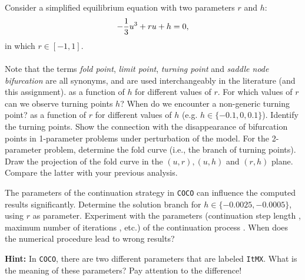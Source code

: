 \begin{Exercise}[name=Imperfect bifurcations]\label{EX22}

Consider a simplified equilibrium equation with two parameters $r$ and $h$:
\[ - \frac{1}{\textcolor{black}{3}}u^3 +ru + h = 0, \] in which $r\in [-1,1]$. \\\\
%
Note that the terms \emph{fold point}, \emph{limit point},
\emph{turning point} and \emph{saddle node bifurcation} are all
synonyms, and are used interchangeably in the literature (and  this
assignment).
\Question {} as a function of $h$ for different values of $r$.
For which values of $r$ can we observe turning points  $h$?
When do we encounter a non-generic turning point?
\Question {} as a function of $r$ for different values of $h$ (e.g. $h \in \{-0.1, 0, 0.1\}$).
Identify the turning points.
Show the connection with the disappearance of bifurcation points in 1-parameter problems under perturbation of the model. 
\Question For the 2-parameter problem, determine the fold curve (i.e., the branch of turning points).
Draw the projection of the fold curve in the $(u,r),
(u,h)$ and $(r,h)$ plane. Compare the latter with your previous
analysis. %

\Question The parameters of the continuation strategy in \texttt{COCO} can influence the computed results significantly. Determine the solution branch for $h \in \{-0.0025, -0.0005\}$, using $r$ as parameter. 
Experiment with the parameters (continuation step length , maximum number of %
iterations , etc.) of the continuation
process .  When does the numerical procedure lead to wrong results? 

\textbf{Hint:} In \texttt{COCO}, there are two different parameters that are labeled \texttt{ItMX}. What is the meaning of these parameters? Pay attention to the difference!
\end{Exercise}
